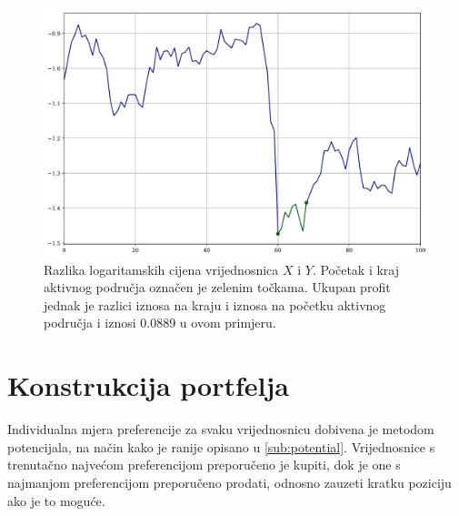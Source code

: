 \documentclass[lmodern, utf8, diplomski, numeric]{fer}
\begin{document}
  \begin{figure}[p]
    \centering
    \includegraphics[width=\linewidth]{graphics/trading-diffs.pdf}
    \caption{Razlika logaritamskih cijena vrijednosnica $X$ i $Y$. Početak i kraj aktivnog područja označen je zelenim točkama. Ukupan profit jednak je razlici iznosa na kraju i iznosa na početku aktivnog područja i iznosi 0.0889 u ovom primjeru.}
    \label{fig:trading-diffs}
  \end{figure}
  
  \section{Konstrukcija portfelja}
  Individualna mjera preferencije za svaku vrijednosnicu dobivena je metodom potencijala, na način kako je ranije opisano u \ref{sub:potential}.
  Vrijednosnice s trenutačno najvećom preferencijom preporučeno je kupiti, dok je one s najmanjom preferencijom preporučeno prodati, odnosno zauzeti kratku poziciju ako je to moguće.
  
\end{document}
